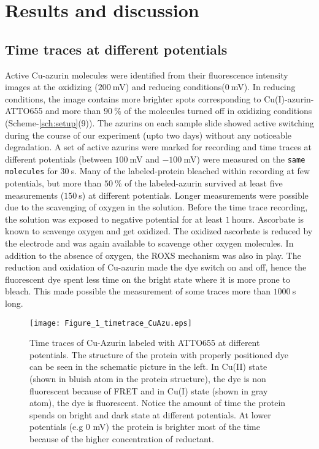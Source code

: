 \section{Results and discussion\label{sec:results}}
\subsection{Time traces at different potentials}
Active Cu-azurin molecules were identified from their fluorescence intensity images at the oxidizing ($200~$mV) and reducing conditions($0~$mV). In reducing conditions, the image contains more brighter spots corresponding to Cu(I)-azurin-ATTO655 and more than $90~$\% of the molecules turned off in oxidizing conditions (Scheme-\ref{sch:setup}(9)). The azurins on each sample slide showed active switching during the course of our experiment (upto two days) without any noticeable degradation. A set of active azurins were marked for recording and time traces at different potentials (between $100~$mV and $-100~$mV) were measured on the \texttt{same molecules} for $30~$s. Many of the labeled-protein bleached within recording at few potentials, but more than $50~$\% of the labeled-azurin survived at least five measurements ($150~$s) at different potentials. Longer measurements were possible due to the scavenging of oxygen in the solution. Before the time trace recording, the solution was exposed to negative potential for at least $1~$hours. Ascorbate is known to  scavenge oxygen\cite{dave1997effectiveness} and get oxidized. The oxidized ascorbate is reduced by the electrode and was again available to scavenge other oxygen molecules. In addition to the absence of oxygen, the ROXS mechanism was also in play. The reduction and oxidation of Cu-azurin made the dye switch on and off, hence the fluorescent dye spent less time on the bright state where it is more prone to bleach. This made possible the measurement of some traces more than $1000~$s long.\\
\begin{figure}
	\centering
	\texttt{[image: Figure\_1\_timetrace\_CuAzu.eps]}
	\caption{Time traces of Cu-Azurin labeled with ATTO655 at different potentials. The structure of the protein with properly positioned dye can be seen in the schematic picture in the left. In Cu(II) state (shown in bluish atom in the protein structure), the dye is non fluorescent because of FRET and in Cu(I) state (shown in gray atom), the dye is fluorescent. Notice the amount of time the protein spends on bright and dark state at different potentials. At lower potentials (e.g 0 mV) the protein is brighter most of the time because of the higher concentration of reductant.}
	\label{fig:timetrace}
\end{figure}
